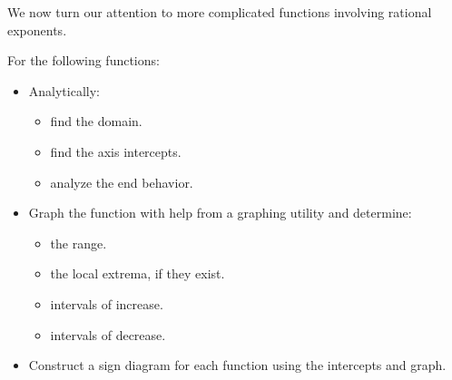 \documentclass{ximera}
\begin{document}
We now turn our attention to more complicated functions involving rational exponents.


\begin{ex}  For the following functions:

\begin{itemize}

\item Analytically:

\begin{multicols}{3}

\begin{itemize}

\item find the domain.

\item find the axis intercepts.

\item analyze the end behavior.

\end{itemize}

\end{multicols}


\item Graph the function with help from a graphing utility and determine:

\begin{multicols}{2}

\begin{itemize}

\item  the range.

\item the local extrema, if they exist.

\end{itemize}

\end{multicols}

\begin{multicols}{2}

\begin{itemize}

\item intervals of increase.

\item intervals of decrease.

\end{itemize}

\end{multicols}

\item Construct a sign diagram for each function using the intercepts and graph.
\end{itemize}


\end{ex}
\end{document}
